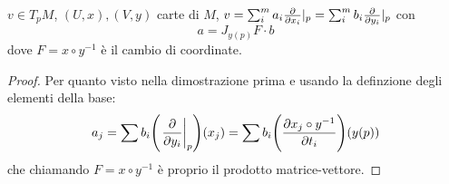 \begin{theorem}
    $v\in T_pM$, $(U,x),(V,y)$ carte di $M$, $v=\sum_i^m
    a_i\pdv{x_i}|_p=\sum_i^m b_i\pdv{y_i}|_p$ con 
    \begin{displaymath}
        a=J_{y(p)}F\cdot b
    \end{displaymath}
    dove $F=x\circ y^{-1}$ è il cambio di coordinate.
\end{theorem}
\begin{proof}
    Per quanto visto nella dimostrazione prima e usando la
    definzione degli elementi della base:
    \begin{displaymath}
        a_j=\sum b_i\Biggl(\eval{\pdv{y_i}}_p\Biggr)(x_j)=
        \sum b_i \Biggl(\pdv{x_j\circ y^{-1}}{t_i}\Biggr)(y(p))
    \end{displaymath}
    che chiamando $F=x\circ y^{-1}$ è proprio il prodotto
    matrice-vettore.
\end{proof}

